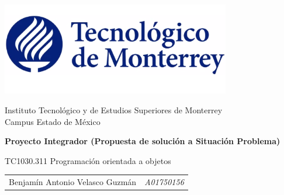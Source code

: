  
\begin{titlepage}
	\begin{center}
		
		\includegraphics[width=0.75\textwidth]{tec}
		
		\LARGE
		Instituto Tecnológico y de Estudios Superiores de Monterrey\\
		Campus Estado de México
		
		\vfill
		
		\LARGE
		\textbf{Proyecto Integrador (Propuesta de solución a Situación Problema)}
		
		\vspace{1cm}
		
		TC1030.311 Programación orientada a objetos
		
		\vfill
		
		\begin{tabular}{ l r }
			Benjamín Antonio Velasco Guzmán		&	\textit{A01750156}
		\end{tabular}
		
		\vfill
		
	\end{center}
\end{titlepage}